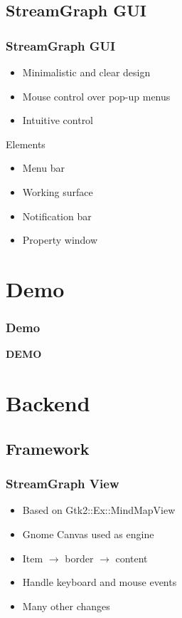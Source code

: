 \documentclass{beamer}
\begin{document}
\subsection{StreamGraph GUI}
\begin{frame}
\frametitle{StreamGraph GUI}
	\begin{itemize}
		\item Minimalistic and clear design
		\item Mouse control over pop-up menus
		\item Intuitive control
	\end{itemize}
	\begin{block}{Elements}
		\begin{itemize}
			\item Menu bar
			\item Working surface
			\item Notification bar
			\item Property window
		\end{itemize}
	\end{block}
\end{frame}


\section{Demo}
\begin{frame}
\frametitle{Demo}
\textbf{DEMO}
\end{frame}


\section{Backend}

\subsection{Framework}
\begin{frame}
\frametitle{StreamGraph View}
 \begin{itemize}
 	\item Based on Gtk2::Ex::MindMapView \cite{GTK2EXMindMapView}
	\item Gnome Canvas used as engine
	\item Item $\rightarrow$ border $\rightarrow$ content
	\item Handle keyboard and mouse events
	\item Many other changes
 \end{itemize}
\end{frame}
\end{document}
